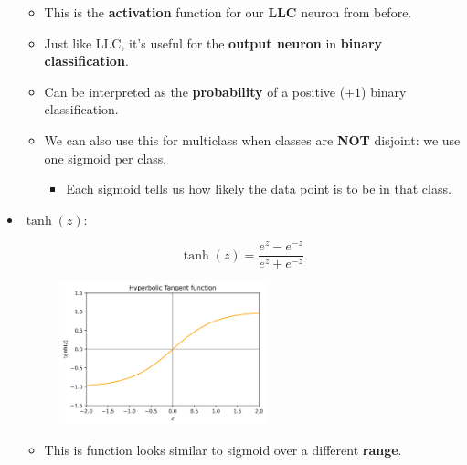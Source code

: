 \begin{itemize}
                \begin{itemize}
                    \item This is the \textbf{activation} function for our \textbf{LLC} neuron from before.
                    
                    \item Just like LLC, it's useful for the \textbf{output neuron} in \textbf{binary classification}.
                    
                    \item Can be interpreted as the \textbf{probability} of a positive ($+1$) binary classification.

                    \item We can also use this for multiclass when classes are \textbf{NOT} disjoint: we use one sigmoid per class.
                        \begin{itemize}
                            \item Each sigmoid tells us how likely the data point is to be in that class.
                        \end{itemize}
                \end{itemize}
                
            \item {} $\tanh(z)$:    
                
                \begin{equation}
                    \tanh(z) = \frac{e^z - e^{-z}}{e^z + e^{-z}}
                \end{equation}
                
                \begin{figure}[H]
                    \centering
                    \includegraphics[width=60mm,scale=0.4]{images/nn_images/tanh_fn.png}
                \end{figure}
                
                \begin{itemize}
                    \item This is function looks similar to sigmoid over a different \textbf{range}.
                    

\end{itemize}
\end{itemize}
